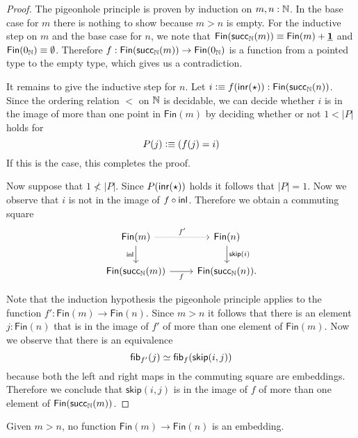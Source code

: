 \begin{proof}
  The pigeonhole principle is proven by induction on $m,n:{\mathbb{N}}$. In the base case for $m$ there is nothing to show because $m>n$ is empty. For the inductive step on $m$ and the base case for $n$, we note that $\mathsf{Fin}(\mathsf{succ}_{{\mathbb{N}}}(m))\equiv \mathsf{Fin}(m)+\underline{\mathbf{1}}$ and $\mathsf{Fin}(0_{{\mathbb{N}}})\equiv \emptyset$. Therefore $f:\mathsf{Fin}(\mathsf{succ}_{{\mathbb{N}}}(m))\to\mathsf{Fin}(0_{{\mathbb{N}}})$ is a function from a pointed type to the empty type, which gives us a contradiction.

  It remains to give the inductive step for $n$. Let $i\vcentcolon\equiv f({\mathsf{inr}}(\star)):\mathsf{Fin}(\mathsf{succ}_{{\mathbb{N}}}(n))$. Since the ordering relation $<$ on ${\mathbb{N}}$ is decidable, we can decide whether $i$ is in the image of more than one point in $\mathsf{Fin}(m)$ by deciding whether or not $1<|P|$ holds for
  \begin{equation*}
    P(j)\vcentcolon\equiv (f(j)=i)
  \end{equation*}
  If this is the case, this completes the proof.

  Now suppose that $1\not<|P|$. Since $P({\mathsf{inr}}(\star))$ holds it follows that $|P|=1$. Now we observe that $i$ is not in the image of $f\circ {\mathsf{inl}}$. Therefore we obtain a commuting square
  \begin{equation*}
    \begin{tikzcd}
      \mathsf{Fin}(m) \arrow[r,densely dotted,"{f'}"] \arrow[d,swap,"\inl"] & \mathsf{Fin}(n) \arrow[d,"{\mathsf{skip}(i)}"] \\
      \mathsf{Fin}(\succN(m)) \arrow[r,swap,"f"] & \mathsf{Fin}(\succN(n)).
    \end{tikzcd}
  \end{equation*}

  Note that the induction hypothesis the pigeonhole principle applies to the function $f':\mathsf{Fin}(m)\to\mathsf{Fin}(n)$. Since $m>n$ it follows that there is an element $j:\mathsf{Fin}(n)$ that is in the image of $f'$ of more than one element of $\mathsf{Fin}(m)$. Now we observe that there is an equivalence
  \begin{equation*}
    \mathsf{fib}_{f'}(j)\simeq \mathsf{fib}_{f}(\mathsf{skip}(i,j))
  \end{equation*}
  because both the left and right maps in the commuting square are embeddings. Therefore we conclude that $\mathsf{skip}(i,j)$ is in the image of $f$ of more than one element of $\mathsf{Fin}(\mathsf{succ}_{{\mathbb{N}}}(m))$. 
 \end{proof}

\begin{cor}\label{cor:pigeonhole}
  Given $m>n$, no function $\mathsf{Fin}(m)\to\mathsf{Fin}(n)$ is an embedding.
\end{cor}

